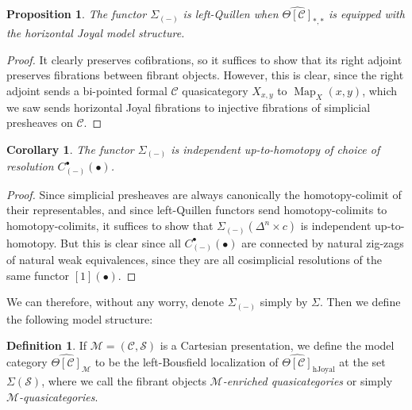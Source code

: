 \documentclass[a4paper]{article}
\numberwithin{equation}{subsection}
\theoremstyle{plain}   %
\newtheorem{prop}[equation]{Proposition}
\newtheorem{cor}[equation]{Corollary}
\theoremstyle{definition}
\newtheorem{defn}[equation]{Definition}
\theoremstyle{remark}
\theoremstyle{plain}
\DeclareMathOperator{\Map}{Map}
\providecommand{\C}{}
\renewcommand{\C}{\ensuremath{\mathcal{C}}}
\newcommand{\M}{\ensuremath{\mathcal{M}}}
\newcommand{\setS}{\ensuremath{\mathscr{S}}}
\newcommand{\cellset}{\ensuremath{\widehat{\Theta[\mathcal{C}]}}}
\begin{document}
\begin{prop} The functor \(\Sigma_{(-)}\) is left-Quillen when \(\cellset_{\ast,\ast}\) is equipped with the horizontal Joyal model structure.
\end{prop}
\begin{proof} 
  It clearly preserves cofibrations, so it suffices to show that its right adjoint preserves fibrations between fibrant objects.  However, this is clear, since the right adjoint sends a bi-pointed formal \(\C\) quasicategory \(X_{x,y}\) to \(\Map_X(x,y)\), which we saw sends horizontal Joyal fibrations to injective fibrations of simplicial presheaves on \(\C\).
\end{proof}
\begin{cor}
  The functor \(\Sigma_{(-)}\) is independent up-to-homotopy of choice of resolution \(C_{(-)}^\bullet(\bullet)\).
\end{cor}
\begin{proof}
  Since simplicial presheaves are always canonically the homotopy-colimit of their representables, and since left-Quillen functors send homotopy-colimits to homotopy-colimits, it suffices to show that \(\Sigma_{(-)}(\Delta^n\times c)\) is independent up-to-homotopy.  But this is clear since all \(C_{(-)}^\bullet(\bullet)\) are connected by natural zig-zags of natural weak equivalences, since they are all cosimplicial resolutions of the same functor \([1](\bullet)\).
\end{proof}
We can therefore, without any worry, denote \(\Sigma_{(-)}\) simply by \(\Sigma\).  Then we define the following model structure:
\begin{defn}
  If \(\M=(\C,\setS)\) is a Cartesian presentation, we define the model category \(\cellset_{\M}\) to be the left-Bousfield localization of \(\cellset_\mathrm{hJoyal}\) at the set \(\Sigma(\setS)\), where we call the fibrant objects \emph{\(\M\)-enriched quasicategories} or simply \emph{\(\M\)-quasicategories}.
\end{defn}
\end{document}

